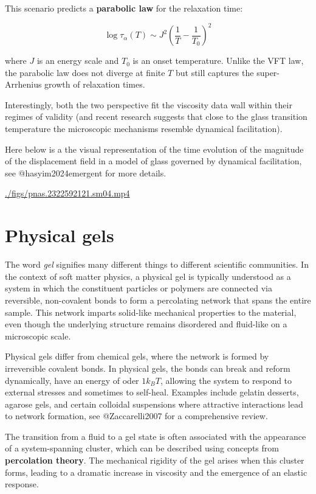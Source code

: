 \documentclass[
  letterpaper,
  enabledeprecatedfontcommands]{report}
\begin{document}
This scenario predicts a \textbf{parabolic law} for the relaxation time:

\[
\log \tau_\alpha(T) \sim J^2 \left( \frac{1}{T} - \frac{1}{T_0} \right)^2
\]

where \(J\) is an energy scale and \(T_0\) is an onset temperature.
Unlike the VFT law, the parabolic law does not diverge at finite \(T\)
but still captures the super-Arrhenius growth of relaxation times.

Interestingly, both the two perspective fit the viscosity data wall
within their regimes of validity (and recent research suggests that
close to the glass transition temperature the microscopic mechanisms
resemble dynamical facilitation).

Here below is a the visual representation of the time evolution of the
magnitude of the displacement field in a model of glass governed by
dynamical facilitation, see @hasyim2024emergent for more details.

\url{./figs/pnas.2322592121.sm04.mp4}

\section{Physical gels}\label{physical-gels}

The word \emph{gel} signifies many different things to different
scientific communities. In the context of soft matter physics, a
physical gel is typically understood as a system in which the
constituent particles or polymers are connected via reversible,
non-covalent bonds to form a percolating network that spans the entire
sample. This network imparts solid-like mechanical properties to the
material, even though the underlying structure remains disordered and
fluid-like on a microscopic scale.

Physical gels differ from chemical gels, where the network is formed by
irreversible covalent bonds. In physical gels, the bonds can break and
reform dynamically, have an energy of oder \(1 k_BT\), allowing the
system to respond to external stresses and sometimes to self-heal.
Examples include gelatin desserts, agarose gels, and certain colloidal
suspensions where attractive interactions lead to network formation, see
@Zaccarelli2007 for a comprehensive review.

The transition from a fluid to a gel state is often associated with the
appearance of a system-spanning cluster, which can be described using
concepts from \textbf{percolation theory}. The mechanical rigidity of
the gel arises when this cluster forms, leading to a dramatic increase
in viscosity and the emergence of an elastic response.
\end{document}
